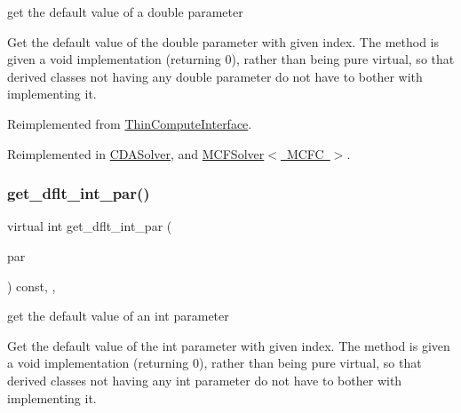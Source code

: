 get the default value of a double parameter 

Get the default value of the double parameter with given index. The method is given a void implementation (returning 0), rather than being pure virtual, so that derived classes not having any double parameter do not have to bother with implementing it. 

Reimplemented from \mbox{\hyperlink{class_s_m_spp__di__unipi__it_1_1_thin_compute_interface_ae2d249f431892cbf41ccf19204b78228}{Thin\+Compute\+Interface}}.



Reimplemented in \mbox{\hyperlink{class_s_m_spp__di__unipi__it_1_1_c_d_a_solver_a465a771c115acf8d5f4e32e22f003014}{C\+D\+A\+Solver}}, and \mbox{\hyperlink{class_s_m_spp__di__unipi__it_1_1_m_c_f_solver_a465a771c115acf8d5f4e32e22f003014}{M\+C\+F\+Solver$<$ M\+C\+F\+C $>$}}.

\mbox{\label{class_s_m_spp__di__unipi__it_1_1_solver_a75dd1491b74c4b9476755e061dce3e04}} 
\subsubsection{\texorpdfstring{get\+\_\+dflt\+\_\+int\+\_\+par()}{get\_dflt\_int\_par()}}
{\footnotesize\ttfamily virtual int get\+\_\+dflt\+\_\+int\+\_\+par (\begin{DoxyParamCaption}\item[{const \mbox{\hyperlink{class_s_m_spp__di__unipi__it_1_1_thin_compute_interface_aa3d710629ad8c434286726ad810c3b47}{idx\+\_\+type}}}]{par }\end{DoxyParamCaption}) const\hspace{0.3cm}{\ttfamily [inline]}, {\ttfamily [override]}, {\ttfamily [virtual]}}



get the default value of an int parameter 

Get the default value of the int parameter with given index. The method is given a void implementation (returning 0), rather than being pure virtual, so that derived classes not having any int parameter do not have to bother with implementing it. 

